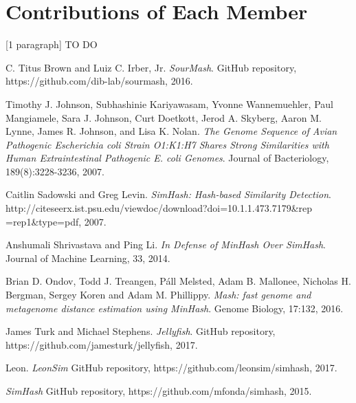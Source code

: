 \documentclass[12pt, letterpaper]{article}
\begin{document}
\section{Contributions of Each Member}
[1 paragraph] \color{red} TO DO \color{black}

\begin{thebibliography}{9}

  C. Titus Brown and Luiz C. Irber, Jr.
  \textit{SourMash}.
  GitHub repository, https://github.com/dib-lab/sourmash, 2016.
  
  Timothy J. Johnson, Subhashinie Kariyawasam, Yvonne Wannemuehler, Paul Mangiamele, Sara J. Johnson, Curt Doetkott, Jerod A. Skyberg, Aaron M. Lynne, James R. Johnson, and Lisa K. Nolan.
  \textit{The Genome Sequence of Avian Pathogenic Escherichia coli Strain O1:K1:H7 Shares Strong Similarities with Human Extraintestinal Pathogenic E. coli Genomes}.
  Journal of Bacteriology, 189(8):3228-3236, 2007.
  
  Caitlin Sadowski and Greg Levin.
  \textit{SimHash: Hash-based Similarity Detection}.
  http://citeseerx.ist.psu.edu/viewdoc/download?doi=10.1.1.473.7179\&rep\\=rep1\&type=pdf, 
  2007.

  Anshumali Shrivastava and Ping Li.
  \textit{In Defense of MinHash Over SimHash}.
  Journal of Machine Learning, 33, 2014.

  Brian D. Ondov, Todd J. Treangen, Páll Melsted, Adam B. Mallonee, Nicholas H. Bergman, Sergey Koren and Adam M. Phillippy.
  \textit{Mash: fast genome and metagenome distance estimation using MinHash}.
  Genome Biology, 17:132, 2016.
  
  James Turk and Michael Stephens.
  \textit{Jellyfish}.
  GitHub repository, https://github.com/jamesturk/jellyfish, 2017.

  Leon.
  \textit{LeonSim}
  GitHub repository, https://github.com/leonsim/simhash, 2017.
  
  \textit{SimHash}
  GitHub repository, https://github.com/mfonda/simhash, 2015.
  

\end{thebibliography}
\end{document}
